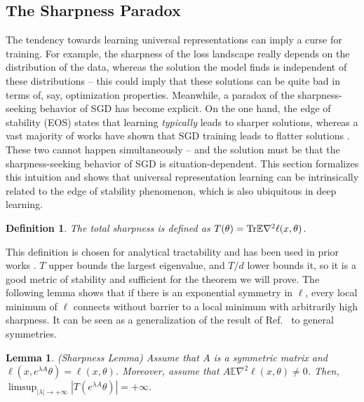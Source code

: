 \documentclass{article}
\theoremstyle{plain}
\newtheorem{lemma}{Lemma}
\newtheorem{definition}{Definition}
\newcommand{\E}{\mathbb{E}}
\newcommand{\Tr}{{\rm Tr}}
\begin{document}
\vspace{-1mm}
\subsection{The Sharpness Paradox}%
\vspace{-1mm}


The tendency towards learning universal representations can imply a curse for training. For example, the sharpness of the loss landscape really depends on the distribution of the data, whereas the solution the model finds is independent of these distributions -- this could imply that these solutions can be quite bad in terms of, say, optimization properties. Meanwhile, a paradox of the sharpness-seeking behavior of SGD has become explicit. On the one hand, the edge of stability (EOS) states that learning \textit{typically} leads to sharper solutions, whereas a vast majority of works have shown that SGD training leads to flatter solutions \cite{damian2021label, wu2022alignment}. These two cannot happen simultaneously -- and the solution must be that the sharpness-seeking behavior of SGD is situation-dependent. This section formalizes this intuition and shows that universal representation learning can be intrinsically related to the edge of stability phenomenon, which is also ubiquitous in deep learning.

\begin{definition}
The total sharpness is defined as $T(\theta)=\Tr\E\nabla^2\ell(x,\theta)$.
\end{definition}
This definition is chosen for analytical tractability and has been used in prior works \cite{li2021happens, ziyin2024parameter}. $T$ upper bounds the largest eigenvalue, and $T/d$ lower bounds it, so it is a good metric of stability and sufficient for the theorem we will prove. The following lemma shows that if there is an exponential symmetry in $\ell$, every local minimum of $\ell$ connects without barrier to a local minimum with arbitrarily high sharpness. It can be seen as a generalization of the result of Ref.~\cite{Dinh_SharpMinima} to general symmetries.


\begin{lemma}
\label{lemma:sharpness}
    (Sharpness Lemma) Assume that $A$ is a symmetric matrix and $\ell(x,e^{\lambda A}\theta)=\ell(x,\theta)$. Moreover, assume that $A\mathbb{E}\nabla^2\ell(x,\theta)\neq0$. Then, $\limsup_{|\lambda|\to+\infty}|T(e^{\lambda A}\theta)|=+\infty$.
\end{lemma}
\end{document}
